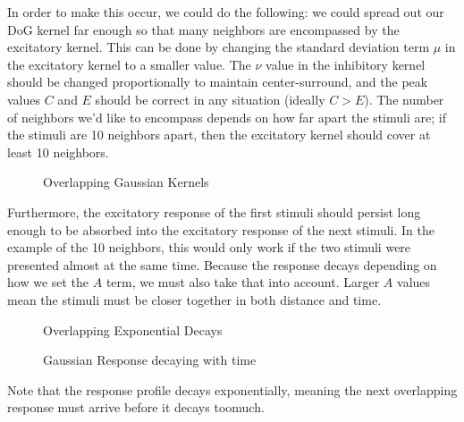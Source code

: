 \documentclass[a4paper,12pt]{article}
\begin{document}
In order to make this occur, we could do the following: we could spread out our DoG kernel far enough so that many neighbors are encompassed by the excitatory kernel. This can be done by changing the standard deviation term $\mu$ in the excitatory kernel to a smaller value. The $\nu$ value in the inhibitory kernel should be changed proportionally to maintain center-surround, and the peak values $C$ and $E$ should be correct in any situation (ideally $C>E$). The number of neighbors we'd like to encompass depends on how far apart the stimuli are; if the stimuli are 10 neighbors apart, then the excitatory kernel should cover at least 10 neighbors. 

\begin{center}
  \begin{figure}[h!]
    \caption{\label{pict1}Overlapping Gaussian Kernels}
  \end{figure}
\end{center}

\vfil\eject

Furthermore, the excitatory response of the first stimuli should persist long enough to be absorbed into the excitatory response of the next stimuli. In the example of the 10 neighbors, this would only work if the two stimuli were presented  almost at the same time. Because the response decays depending on how we set the $A$ term, we must also take that into account. Larger $A$ values mean the stimuli must be closer together in both distance and time. 

\begin{center}
  \begin{figure}[h!]
    \caption{\label{pict1}Overlapping Exponential Decays}
  \end{figure}
\end{center}

\vfil\eject

\begin{center}
  \begin{figure}[h!]
    \caption{\label{pict1}Gaussian Response decaying with time}
  \end{figure}
\end{center}

Note that the response profile decays exponentially, meaning the next overlapping response must arrive before it decays toomuch. 
\end{document}
